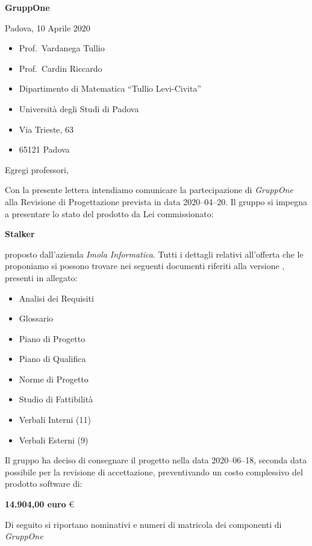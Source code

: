 \documentclass{article}
\begin{document}
\begin{center}
  {\LARGE \textbf{GruppOne}}
\end{center}

\begin{multicols}{2}
  Padova, 10 Aprile 2020
  \columnbreak{}
  \begin{itemize}
    \setlength{\itemsep}{0mm}
    \setlength{\parskip}{0mm}
    \renewcommand{\labelitemi}{}
    \item Prof.\ Vardanega Tullio
    \item Prof.\ Cardin Riccardo
    \item Dipartimento di Matematica ``Tullio Levi-Civita''
    \item Università degli Studi di Padova
    \item Via Trieste, 63
    \item 65121 Padova
  \end{itemize}
\end{multicols}
Egregi professori,

Con la presente lettera intendiamo comunicare la partecipazione di \textit{GruppOne} alla Revisione di Progettazione prevista in data 2020--04--20.
Il gruppo si impegna a presentare lo stato del prodotto da Lei commissionato:
\begin{center}
  \textbf{Stalker}
\end{center}
proposto dall'azienda \textit{Imola Informatica}.
Tutti i dettagli relativi all'offerta che le proponiamo si possono trovare nei seguenti documenti riferiti alla versione , presenti in allegato:
\begin{itemize}
  \item Analisi dei Requisiti
  \item Glossario
  \item Piano di Progetto
  \item Piano di Qualifica
  \item Norme di Progetto
  \item Studio di Fattibilità
  \item Verbali Interni (11)
  \item Verbali Esterni (9)
\end{itemize}

Il gruppo ha deciso di consegnare il progetto nella data 2020--06--18, seconda data possibile per la revisione di accettazione, preventivando un costo complessivo del prodotto software di:
\begin{center}
  \textbf{14.904,00 euro} €
\end{center}
\newpage
Di seguito si riportano nominativi e numeri di matricola dei componenti di \textit{GruppOne}
\end{document}
